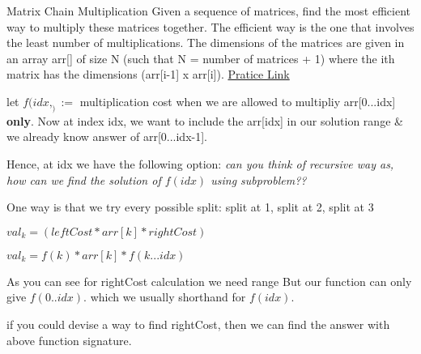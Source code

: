 \begin{problem}{Matrix Chain Multiplication}
    Given a sequence of matrices, find the most efficient way to multiply these matrices together. The efficient way is the one that involves the least number of multiplications.
    The dimensions of the matrices are given in an array arr[] of size N (such that N = number of matrices + 1) where the ith matrix has the dimensions (arr[i-1] x arr[i]).
    \href{https://practice.geeksforgeeks.org/problems/matrix-chain-multiplication0303/1}{Pratice Link}
\end{problem}

\begin{solution}
    let $f(idx,_):= $ multiplication cost when we are allowed to multipliy arr[0...idx] \textbf{only}.
    Now at index idx, we want to include the arr[idx] in our solution range \& we already know answer of arr[0...idx-1].

    Hence, at idx we have the following option:
    \textit{can you think of recursive way as, how can we find the solution of $f(idx)$ using subproblem??}

    One way is that we try every possible split: 
    split at 1, split at 2, split at 3 

    $ val_k =( leftCost * arr[k] * rightCost )$

    
    $ val_k = f(k)*arr[k]* f(k...idx) $
    
    As you can see for rightCost calculation we need range 
    But our function can only give $f(0..idx)$.  which we usually shorthand for $f(idx)$.

    if you could devise a way to find rightCost, then we can find the answer with above function signature.


\end{solution}

